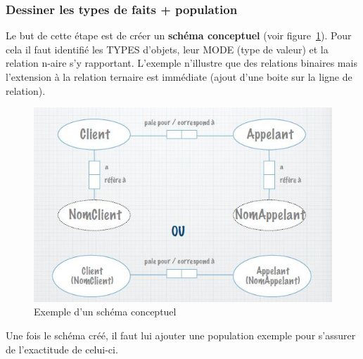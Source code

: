 \subsubsection{Dessiner les types de faits + population}
Le but de cette étape est de créer un \textbf{schéma conceptuel}
(voir figure~\ref{schema_conceptuel}).
Pour cela il faut identifié les TYPES d'objets, leur MODE (type de valeur)
et la relation n-aire s'y rapportant.
L'exemple n'illustre que des relations binaires mais l'extension
à la relation ternaire est immédiate
(ajout d'une boite sur la ligne de relation).
\begin{figure}[h]
  \centering
  \includegraphics[scale=0.7]{schema_conceptuel.jpg}
  \caption{Exemple d'un schéma conceptuel}
  \label{schema_conceptuel}
\end{figure}
Une fois le schéma créé,
il faut lui ajouter une population exemple pour
s'assurer de l'exactitude de celui-ci.

